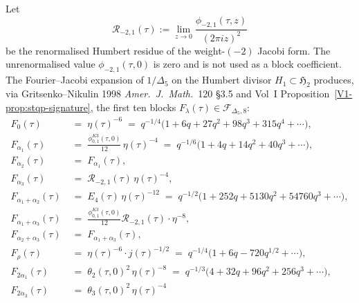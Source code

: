 \begin{theorem}
\label{thm:modbootstrap-cross-explicit-blocks}
\ClaimStatusConditional
{}
Let
\[
 \mathcal R_{-2,1}(\tau)
 :=
 \lim_{z\to0}\frac{\phi_{-2,1}(\tau,z)}{(2\pi iz)^2}
\]
be the renormalised Humbert residue of the weight-$(-2)$ Jacobi form.
The unrenormalised value $\phi_{-2,1}(\tau,0)$ is zero and is not used
as a block coefficient.
The Fourier--Jacobi expansion of $1/\Delta_5$ on the
Humbert divisor $H_1\subset\mathfrak H_2$ produces, via
Gritsenko--Nikulin 1998 \emph{Amer.~J.~Math.}~120 \S 3.5 and
Vol~I Proposition~\ref{V1-prop:stqp-signature}, the first ten
blocks $F_\lambda(\tau)\in\mathcal F_{\Delta_5, 8}$:
\begin{align}
 F_0(\tau)
 &\;=\;\eta(\tau)^{-6}
 \;=\;q^{-1/4}\bigl(1 + 6q + 27q^2 + 98q^3 + 315q^4 + \cdots\bigr),
 \label{eq:modbootstrap-explicit-F0}\\
 F_{\alpha_1}(\tau)
 &\;=\;\frac{\phi_{0,1}^{K3}(\tau,0)}{12}\,\eta(\tau)^{-4}
 \;=\;q^{-1/6}\bigl(1 + 4q + 14q^2 + 40q^3 + \cdots\bigr),
 \label{eq:modbootstrap-explicit-Fa1}\\
 F_{\alpha_2}(\tau)
 &\;=\;F_{\alpha_1}(\tau),
 \label{eq:modbootstrap-explicit-Fa2}\\
 F_{\alpha_3}(\tau)
 &\;=\;\mathcal R_{-2,1}(\tau)\,\eta(\tau)^{-4},
 \label{eq:modbootstrap-explicit-Fa3}\\
 F_{\alpha_1 + \alpha_2}(\tau)
 &\;=\;E_4(\tau)\,\eta(\tau)^{-12}
 \;=\;q^{-1/2}\bigl(1 + 252q + 5130q^2 + 54760q^3 + \cdots\bigr),
 \label{eq:modbootstrap-explicit-Fa1a2}\\
 F_{\alpha_1 + \alpha_3}(\tau)
 &\;=\;\frac{\phi_{0,1}^{K3}(\tau,0)}{12}\mathcal R_{-2,1}(\tau)\cdot\eta^{-8},
 \label{eq:modbootstrap-explicit-Fa1a3}\\
 F_{\alpha_2 + \alpha_3}(\tau)
 &\;=\;F_{\alpha_1 + \alpha_3}(\tau),
 \label{eq:modbootstrap-explicit-Fa2a3}\\
 F_{\rho}(\tau)
 &\;=\;\eta(\tau)^{-6}\cdot j(\tau)^{-1/2}
 \;=\;q^{-1/4}\bigl(1 + 6q - 720 q^{1/2} + \cdots\bigr),
 \label{eq:modbootstrap-explicit-Frho}\\
 F_{2\alpha_1}(\tau)
 &\;=\;\theta_2(\tau,0)^2\,\eta(\tau)^{-8}
 \;=\;q^{-1/3}\bigl(4 + 32q + 96q^2 + 256q^3 + \cdots\bigr),
 \label{eq:modbootstrap-explicit-F2a1}\\
 F_{2\alpha_3}(\tau)
 &\;=\;\theta_3(\tau,0)^2\,\eta(\tau)^{-4}

\end{align}
\end{theorem}
